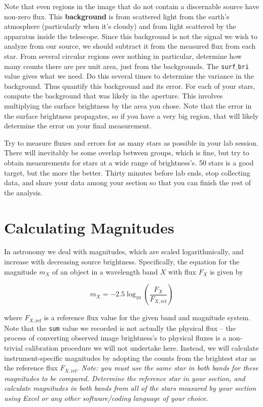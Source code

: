 
Note that even regions in the image that do not contain a discernable source have non-zero flux. This \textbf{background} is from scattered light from the earth's atmosphere (particularly when it's cloudy) and from light scattered by the apparatus inside the telescope. Since this background is not the signal we wish to analyze from our source, we should subtract it from the measured flux from each star. From several circular regions over nothing in particular, determine how many counts there are per unit area, just from the backgrounds.  The \texttt{surf$\_$bri} value gives what we need.  Do this several times to determine the variance in the background.  Thus quantify this background and its error. For each of your stars, compute the background that was likely in the aperture.  This involves multiplying the surface brightness by the area you chose.  Note that the error in the surface brightness propagates, so if you have a very big region, that will likely determine the error on your final measurement. 

Try to measure fluxes and errors for as many stars as possible in your lab session. There will inevitably be some overlap between groups, which is fine, but try to obtain measurements for stars at a wide range of brightness’s. 50 stars is a good target, but the more the better. Thirty minutes before lab ends, stop collecting data, and share your data among your section so that you can finish the rest of the analysis.

\section{Calculating Magnitudes}

In astronomy we deal with magnitudes, which are scaled logarithmically, and increase with decreasing source brightness. Specifically, the equation for the magnitude $m_X$ of an object in a wavelength band $X$ with flux $F_X$ is given by 

\begin{equation}
m_{X} = -2.5\log_{10}\left(\frac{F_X}{F_{X,{\textrm{ref}}}}\right)
\end{equation}

where $F_{X,{\textrm{ref}}}$ is a reference flux value for the given band and magnitude system. Note that the \texttt{sum} value we recorded is not actually the physical flux -- the process of converting observed image brightness's to physical fluxes is a non-trivial calibration procedure we will not undertake here. Instead, we will calculate instrument-specific magnitudes by adopting the counts from the brightest star as the reference flux $F_{X,\textrm{ref}}$. \textit{Note: you must use the same star in both bands for these magnitudes to be compared. Determine the reference star in your section, and calculate magnitudes in both bands from all of the stars measured by your section using Excel or any other software/coding language of your choice.}

